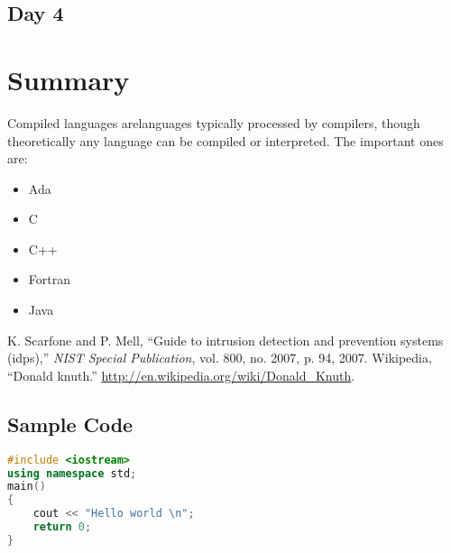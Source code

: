 \documentclass{fisattraining}
\begin{document}
\section{Day 4}

\chapter{Summary}

Compiled languages arelanguages typically processed by compilers, though theoretically any language can be compiled or interpreted. The important ones are:
\begin{itemize}
\item Ada
\item C
\item C++
\item Fortran
\item Java
\end{itemize}



\begin{thebibliography}{1}
 K. Scarfone and P. Mell, ``Guide to intrusion detection and prevention systems
(idps),'' \textit{NIST Special Publication}, vol. 800, no. 2007, p. 94, 2007.
 Wikipedia, ``Donald knuth.'' \url{http://en.wikipedia.org/wiki/Donald_Knuth}.
\end{thebibliography}

\begin{appendices}
\chapter{Sample Code}
\begin{lstlisting}[language=c++]
#include <iostream>
using namespace std;
main()
{
	cout << "Hello world \n";
	return 0;
}
\end{lstlisting}
\end{appendices}
\end{document}
